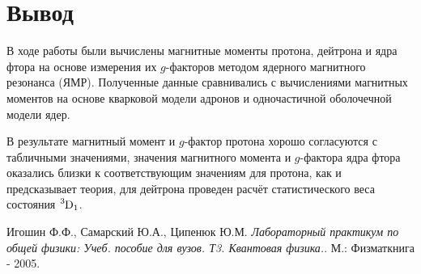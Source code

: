 \documentclass[a4paper,12pt]{article}
\theoremstyle{definition}
\begin{document}
\section{Вывод}
В ходе работы были вычислены магнитные моменты протона, дейтрона и ядра фтора на основе измерения их $g$-факторов методом ядерного магнитного резонанса (ЯМР). Полученные данные сравнивались с вычислениями магнитных моментов на основе кварковой модели адронов и одночастичной оболочечной модели ядер.

В результате магнитный момент и $g$-фактор протона хорошо согласуются с табличными значениями, значения магнитного момента и $g$-фактора ядра фтора оказались близки к соответствующим значениям для протона, как и предсказывает теория, для дейтрона проведен расчёт статистического веса состояния $\ce{^3D1}$.

\begin{thebibliography}{9}
Игошин Ф.Ф., Самарский Ю.А., Ципенюк Ю.М.
\textit{Лабораторный практикум по общей физики: Учеб. пособие для вузов. Т3. Квантовая физика.}. 
М.: Физматкнига - 2005.
\end{thebibliography}
\end{document}

